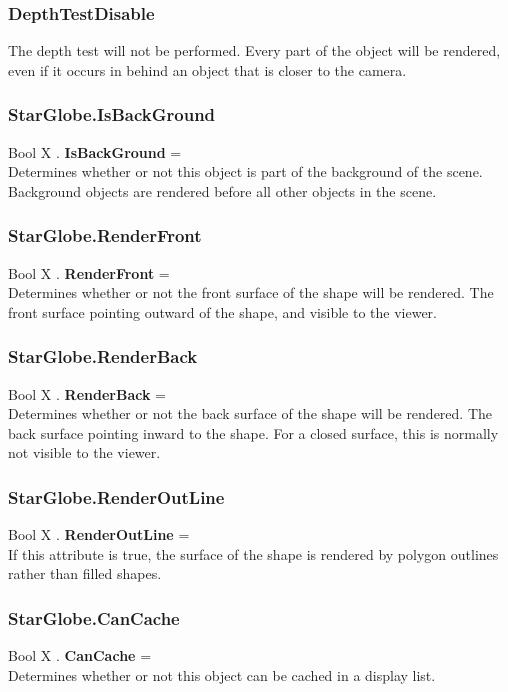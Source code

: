\subsubsection{DepthTestDisable \label{T:DepthTest|DepthTestDisable}}
The depth test will not be performed. Every part of the object will be rendered, even if it occurs in behind an object that is closer to the camera.

\subsubsection{StarGlobe.IsBackGround \label{F:StarGlobe:IsBackGround}}
Bool X . \textbf{IsBackGround} = \\
Determines whether or not this object is part of the background of the scene. Background objects are rendered before all other objects in the scene.

\subsubsection{StarGlobe.RenderFront \label{F:StarGlobe:RenderFront}}
Bool X . \textbf{RenderFront} = \\
Determines whether or not the front surface of the shape will be rendered. The front surface pointing outward of the shape, and visible to the viewer.

\subsubsection{StarGlobe.RenderBack \label{F:StarGlobe:RenderBack}}
Bool X . \textbf{RenderBack} = \\
Determines whether or not the back surface of the shape will be rendered. The back surface pointing inward to the shape. For a closed surface, this is normally not visible to the viewer.

\subsubsection{StarGlobe.RenderOutLine \label{F:StarGlobe:RenderOutLine}}
Bool X . \textbf{RenderOutLine} = \\
If this attribute is true, the surface of the shape is rendered by polygon outlines rather than filled shapes.

\subsubsection{StarGlobe.CanCache \label{F:StarGlobe:CanCache}}
Bool X . \textbf{CanCache} = \\
Determines whether or not this object can be cached in a display list.

